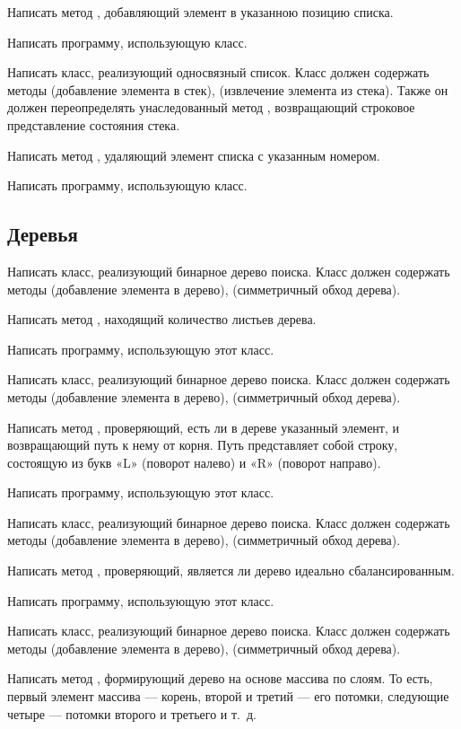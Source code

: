 Написать метод , добавляющий элемент в указанною позицию
списка.

Написать программу, использующую класс.

\task Написать класс, реализующий односвязный список. Класс должен
содержать методы  (добавление элемента в стек), 
(извлечение элемента из стека). Также он должен переопределять
унаследованный метод , возвращающий строковое
представление состояния стека.

Написать метод , удаляющий элемент списка с указанным
номером.

Написать программу, использующую класс.


\subsection{Деревья}

\task Написать класс, реализующий бинарное дерево поиска. Класс должен
содержать методы  (добавление элемента в дерево),
 (симметричный обход дерева).

Написать метод , находящий количество листьев дерева.

Написать программу, использующую этот класс.

\task Написать класс, реализующий бинарное дерево поиска. Класс должен
содержать методы  (добавление элемента в дерево),
 (симметричный обход дерева).

Написать метод , проверяющий, есть ли в дереве указанный
элемент, и возвращающий путь к нему от корня. Путь представляет собой
строку, состоящую из букв «L» (поворот налево) и «R» (поворот
направо).

Написать программу, использующую этот класс.

\task Написать класс, реализующий бинарное дерево поиска. Класс должен
содержать методы  (добавление элемента в дерево),
 (симметричный обход дерева).

Написать метод , проверяющий, является ли дерево идеально сбалансированным.

Написать программу, использующую этот класс.

\task Написать класс, реализующий бинарное дерево поиска. Класс должен
содержать методы  (добавление элемента в дерево),
 (симметричный обход дерева).

Написать метод , формирующий дерево на основе массива
по слоям. То есть, первый элемент массива — корень, второй и третий —
его потомки, следующие четыре — потомки второго и третьего и т.~д.

